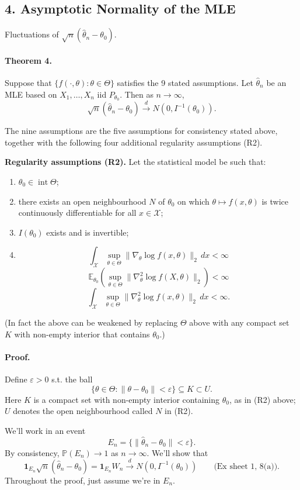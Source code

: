 \documentclass[11pt,a4paper]{article}
\begin{document}
\subsection*{4. Asymptotic Normality of the MLE}
Fluctuations of $\sqrt{n}(\hat{\theta}_n-\theta_0)$.

\paragraph{Theorem 4.}
Suppose that $\{f(\cdot,\theta):\theta\in\Theta\}$ satisfies the 9 stated
assumptions. Let $\hat{\theta}_n$ be an MLE based on $X_1,\ldots,X_n$
iid $P_{\theta_0}$. Then as $n\to\infty$,
\[
\sqrt{n}(\hat{\theta}_n-\theta_0)\xrightarrow{d}
N(0,I^{-1}(\theta_0)).
\]

The nine assumptions are the five assumptions for consistency stated above,
together with the following four additional regularity assumptions (R2).

\medskip\noindent\textbf{Regularity assumptions (R2).} Let the statistical model be such that:
\begin{enumerate}
\item[(1)] $\theta_0\in\operatorname{int}\Theta$;
\item[(2)] there exists an open neighbourhood $N$ of $\theta_0$ on which
$\theta\mapsto f(x,\theta)$ is twice continuously differentiable for all $x\in\mathcal{X}$;
\item[(3)] $I(\theta_0)$ exists and is invertible;
\item[(4)]
\[
\int_{\mathcal{X}}\sup_{\theta\in\Theta}
\|\nabla_\theta\log f(x,\theta)\|_2\,dx<\infty
\]
\[
\mathbb{E}_{\theta_0}\left(\sup_{\theta\in\Theta}
\|\nabla_\theta^2\log f(X,\theta)\|_2\right)<\infty
\]
\[
\int_{\mathcal{X}}\sup_{\theta\in\Theta}
\|\nabla_\theta^2\log f(x,\theta)\|_2\,dx<\infty.
\]
\end{enumerate}
(In fact the above can be weakened by replacing $\Theta$ above with any compact set $K$ with
non-empty interior that contains $\theta_0$.)

\paragraph{Proof.}
Define $\varepsilon>0$ s.t. the ball
\[
\{\theta\in\Theta:\|\theta-\theta_0\|<\varepsilon\}\subseteq K\subset U.
\]
Here $K$ is a compact set with non-empty interior containing $\theta_0$,
as in (R2) above; $U$ denotes the open neighbourhood called $N$ in (R2).

We'll work in an event
\[
E_n=\{\|\hat{\theta}_n-\theta_0\|<\varepsilon\}.
\]
By consistency, $\mathbb{P}(E_n)\to1$ as $n\to\infty$.
We'll show that
\[
\mathbf{1}_{E_n}\sqrt{n}(\hat{\theta}_n-\theta_0)
=\mathbf{1}_{E_n}W_n\xrightarrow{d}N(0,I^{-1}(\theta_0))
\qquad\text{(Ex sheet 1, 8(a)).}
\]
Throughout the proof, just assume we're in $E_n$.
\end{document}
